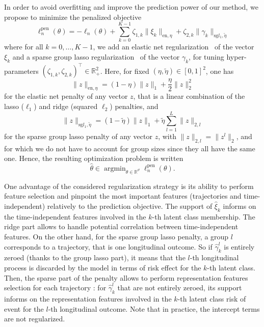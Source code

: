 \documentclass[11pt]{article}
\DeclareMathOperator{\argmin}{argmin}
\newcommand{\norm}[1]{\|#1\|}
\newcommand{\R}{\mathds R}
\begin{document}
In order to avoid overfitting and improve the prediction power of our method, we propose to minimize the penalized objective
\begin{equation}
  \label{eq:pen-log-lik}
	\ell_n^\text{pen}(\theta) = - \ell_n(\theta) + \sum_{k=0}^{K-1} \zeta_{1,k} \norm{\xi_k}_{\text{en}, \eta} + \zeta_{2,k} \norm{\gamma_k}_{\text{sg} l_1, \tilde{\eta}}
\end{equation}
where for all $k=0, \ldots, K-1$, we add an elastic net regularization~\citep{zou2005regularization} of the vector $\xi_k$ and a sparse group lasso regularization~\citep{simon2013sparse} of the vector $\gamma_k$, for tuning hyper-parameters $(\zeta_{1,k}, \zeta_{2,k})^\top \in \R_+^2$. Here, for fixed $(\eta, \tilde{\eta}) \in [0, 1]^2$, one has
\[ \norm{z}_{\text{en}, \eta} = (1-\eta)\norm{z}_1 + \dfrac\eta2 \norm{z}_2^2 \]
for the elastic net penalty of any vector $z$, that is a linear combination of the lasso ($\ell_1$) and ridge (squared $\ell_2$) penalties, and
\[ \norm{z}_{\text{sg} l_1, \tilde{\eta}} = (1-\tilde{\eta})\norm{z}_1 + \tilde{\eta} \sum_{l=1}^L\norm{z}_{2,l} \] for the sparse group lasso penalty of any vector $z$, with $\norm{z}_{2,l}=\norm{z^l}_2$, and for which we do not have to account for group sizes since they all have the same one. 
Hence, the resulting optimization problem is written
\begin{equation}
  \label{eq:optim-pb}
   \hat \theta \in \argmin_{\theta \in \R^\vartheta} \ell_n^\text{pen}(\theta).
 \end{equation}

One advantage of the considered regularization strategy is its ability to perform feature selection and pinpoint the most important features (trajectories and time-independent) relatively to the prediction objective. The support of $\hat \xi_k$ informs on the time-independent features involved in the $k$-th latent class membership. The ridge part allows to handle potential correlation between time-independent features.
On the other hand, for the sparse group lasso penalty, a group $l$ corresponds to a trajectory, that is one longitudinal outcome. So if $\hat \gamma_k^l$ is entirely zeroed (thanks to the group lasso part), it means that the $l$-th longitudinal process is discarded by the model in terms of risk effect for the $k$-th latent class.
Then, the sparse part of the penalty allows to perform representation features selection for each trajectory : for $\hat \gamma_k^l$ that are not entirely zeroed, its support informs on the representation features involved in the $k$-th latent class risk of event for the $l$-th longitudinal outcome.
Note that in practice, the intercept terms are not regularized.
\end{document}
